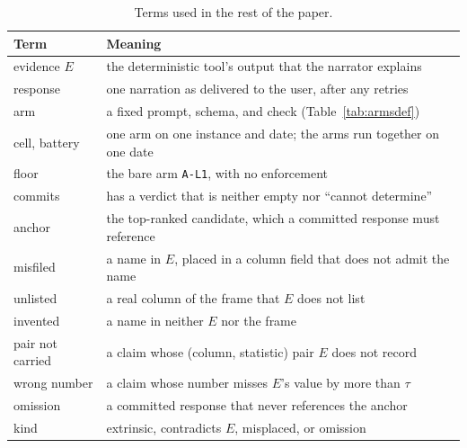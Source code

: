 \documentclass[journal]{IEEEtran}
\begin{document}
\begin{table}[!htbp]
\caption{Terms used in the rest of the paper.}
\label{tab:terms}
\centering
\footnotesize
\setlength{\tabcolsep}{3pt}
\begin{tabular}{@{}lp{6.1cm}@{}}
\toprule
Term & Meaning \\
\midrule
evidence $E$ & the deterministic tool's output that the narrator explains \\
response & one narration as delivered to the user, after any retries \\
arm & a fixed prompt, schema, and check (Table~\ref{tab:armsdef}) \\
cell, battery & one arm on one instance and date; the arms run together on one date \\
floor & the bare arm \texttt{A-L1}, with no enforcement \\
commits & has a verdict that is neither empty nor ``cannot determine'' \\
anchor & the top-ranked candidate, which a committed response must reference \\
misfiled & a name in $E$, placed in a column field that does not admit the name \\
unlisted & a real column of the frame that $E$ does not list \\
invented & a name in neither $E$ nor the frame \\
pair not carried & a claim whose (column, statistic) pair $E$ does not record \\
wrong number & a claim whose number misses $E$'s value by more than $\tau$ \\
omission & a committed response that never references the anchor \\
kind & extrinsic, contradicts $E$, misplaced, or omission \\
\bottomrule
\end{tabular}
\end{table}
\end{document}
